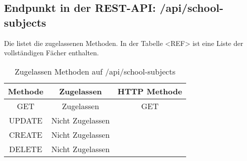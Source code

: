 \subsection{Endpunkt in der REST-API: /api/school-subjects}
\label{sec:end:rest:api:school-subjects}
Die  listet die zugelassenen Methoden. 
In der Tabelle <REF> ist eine Liste der vollständigen Fächer enthalten.


\begin{table}[!htbp]
	\begin{tabular}{|c|c|c|}
		\hline
			\textbf{Methode} & \textbf{Zugelassen} & \textbf{HTTP Methode} \\ \hline
			GET & Zugelassen & GET \\ \hline
			UPDATE & Nicht Zugelassen & \\ \hline 
			CREATE & Nicht Zugelassen & \\ \hline 
			DELETE & Nicht Zugelassen & \\ \hline
	\end{tabular}

		\caption{Zugelassen Methoden auf /api/school-subjects}
		\label{tab:end:rest:api:school-subjects:meth}
\end{table}





